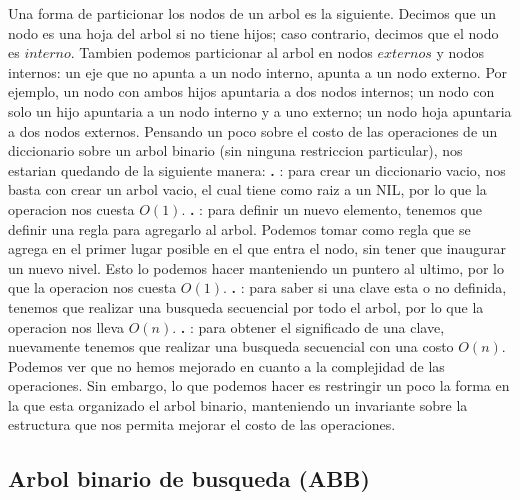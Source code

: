 \documentclass[10pt,a4paper]{article}
\begin{document}
\newline
\newline
Una forma de particionar los nodos de un arbol es la siguiente. Decimos que un nodo es una hoja del arbol si no tiene hijos; caso contrario, decimos que el nodo es $interno$. Tambien podemos particionar al arbol en nodos $externos$ y nodos internos: un eje que no apunta a un nodo interno, apunta a un nodo externo. Por ejemplo, un nodo con ambos hijos apuntaria a dos nodos internos; un nodo con solo un hijo apuntaria a un nodo interno y a uno externo; un nodo hoja apuntaria a dos nodos externos.
\newline
\newline
Pensando un poco sobre el costo de las operaciones de un diccionario sobre un arbol binario (sin ninguna restriccion particular), nos estarian quedando de la siguiente manera:
\newline
\newline
\textbf{.} : para crear un diccionario vacio, nos basta con crear un arbol vacio, el cual tiene como raiz a un NIL, por lo que la operacion nos cuesta $O(1)$.
\newline
\newline
\textbf{.} : para definir un nuevo elemento, tenemos que definir una regla para agregarlo al arbol. Podemos tomar como regla que se agrega en el primer lugar posible en el que entra el nodo, sin tener que inaugurar un nuevo nivel. Esto lo podemos hacer manteniendo un puntero al ultimo, por lo que la operacion nos cuesta $O(1)$.
\newline
\newline
\textbf{.} : para saber si una clave esta o no definida, tenemos que realizar una busqueda secuencial por todo el arbol, por lo que la operacion nos lleva $O(n)$.
\newline
\newline
\textbf{.} : para obtener el significado de una clave, nuevamente tenemos que realizar una busqueda secuencial con una costo $O(n)$.
\newline
\newline
Podemos ver que no hemos mejorado en cuanto a la complejidad de las operaciones. Sin embargo, lo que podemos hacer es restringir un poco la forma en la que esta organizado el arbol binario, manteniendo un invariante sobre la estructura que nos permita mejorar el costo de las operaciones.

\subsection{Arbol binario de busqueda (ABB)}
\end{document}
